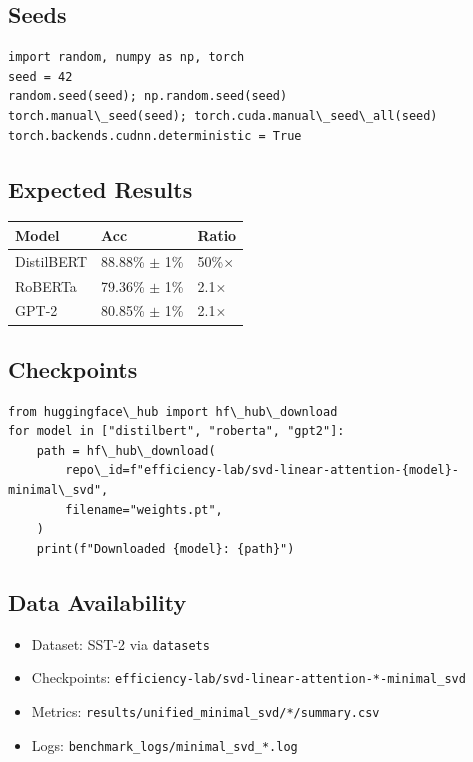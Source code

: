 \subsection{Seeds}

\begin{lstlisting}
import random, numpy as np, torch
seed = 42
random.seed(seed); np.random.seed(seed)
torch.manual\_seed(seed); torch.cuda.manual\_seed\_all(seed)
torch.backends.cudnn.deterministic = True
\end{lstlisting}

\subsection{Expected Results}

\begin{table}[H]
\centering
\small
\begin{tabular}{lll}
\toprule
\textbf{Model} & \textbf{Acc} & \textbf{Ratio} \\
\midrule
DistilBERT & 88.88\% $\pm$ 1\% & 50\%$\times$ \\
RoBERTa & 79.36\% $\pm$ 1\% & 2.1$\times$ \\
GPT-2 & 80.85\% $\pm$ 1\% & 2.1$\times$ \\
\bottomrule
\end{tabular}
\end{table}

\subsection{Checkpoints}

\begin{lstlisting}
from huggingface\_hub import hf\_hub\_download
for model in ["distilbert", "roberta", "gpt2"]:
    path = hf\_hub\_download(
        repo\_id=f"efficiency-lab/svd-linear-attention-{model}-minimal\_svd",
        filename="weights.pt",
    )
    print(f"Downloaded {model}: {path}")
\end{lstlisting}

\subsection{Data Availability}

\begin{itemize}
\item Dataset: SST-2 via \texttt{datasets}
\item Checkpoints: \texttt{efficiency-lab/svd-linear-attention-*-minimal\_svd}
\item Metrics: \texttt{results/unified\_minimal\_svd/*/summary.csv}
\item Logs: \texttt{benchmark\_logs/minimal\_svd\_*.log}

\end{itemize}
